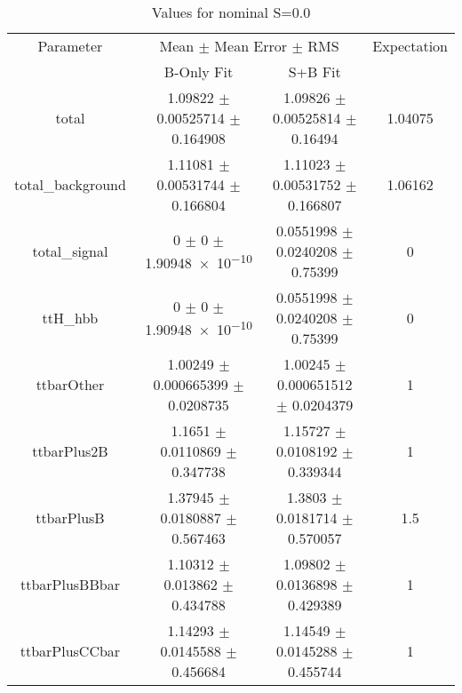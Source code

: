 \begin{table}
\centering
\caption{Values for nominal S=0.0}
\begin{tabular}{cccc}
\toprule
Parameter & \multicolumn{2}{c}{Mean $\pm$ Mean Error $\pm$ RMS} & Expectation\\
 & B-Only Fit & S+B Fit & \\
\midrule
total & \num{1.09822} $\pm$ \num{0.00525714} $\pm$ \num{0.164908} & \num{1.09826} $\pm$ \num{0.00525814} $\pm$ \num{0.16494} & \num{1.04075}\\
total\_background & \num{1.11081} $\pm$ \num{0.00531744} $\pm$ \num{0.166804} & \num{1.11023} $\pm$ \num{0.00531752} $\pm$ \num{0.166807} & \num{1.06162}\\
total\_signal & \num{0} $\pm$ \num{0} $\pm$ \num{1.90948e-10} & \num{0.0551998} $\pm$ \num{0.0240208} $\pm$ \num{0.75399} & \num{0}\\
ttH\_hbb & \num{0} $\pm$ \num{0} $\pm$ \num{1.90948e-10} & \num{0.0551998} $\pm$ \num{0.0240208} $\pm$ \num{0.75399} & \num{0}\\
ttbarOther & \num{1.00249} $\pm$ \num{0.000665399} $\pm$ \num{0.0208735} & \num{1.00245} $\pm$ \num{0.000651512} $\pm$ \num{0.0204379} & \num{1}\\
ttbarPlus2B & \num{1.1651} $\pm$ \num{0.0110869} $\pm$ \num{0.347738} & \num{1.15727} $\pm$ \num{0.0108192} $\pm$ \num{0.339344} & \num{1}\\
ttbarPlusB & \num{1.37945} $\pm$ \num{0.0180887} $\pm$ \num{0.567463} & \num{1.3803} $\pm$ \num{0.0181714} $\pm$ \num{0.570057} & \num{1.5}\\
ttbarPlusBBbar & \num{1.10312} $\pm$ \num{0.013862} $\pm$ \num{0.434788} & \num{1.09802} $\pm$ \num{0.0136898} $\pm$ \num{0.429389} & \num{1}\\
ttbarPlusCCbar & \num{1.14293} $\pm$ \num{0.0145588} $\pm$ \num{0.456684} & \num{1.14549} $\pm$ \num{0.0145288} $\pm$ \num{0.455744} & \num{1}\\
\bottomrule
\end{tabular}
\end{table}